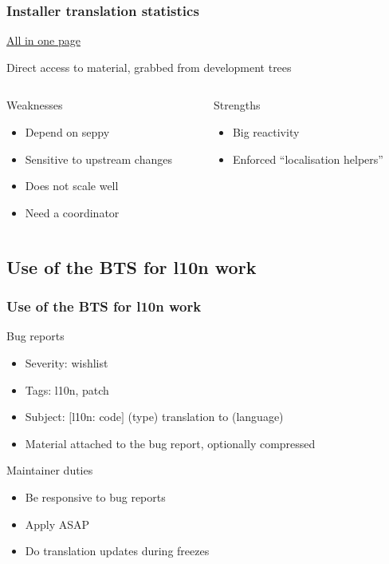 \documentclass{beamer}
\begin{document}
\begin{frame}
  \frametitle{Installer translation statistics}
	\begin{block}
		{\href{http://people.debian.org/~seppy/d-i/translation-status.html}{All in one page}}
	\end{block}
	\begin{block}
		{Direct access to material, grabbed from development trees}
	\end{block}
  \begin{columns}
    \begin{column}{4.5cm}
	\begin{block}
		{Weaknesses}
		\begin{itemize}
		\item
			Depend on seppy
		\item
			Sensitive to upstream changes
		\item
			Does not scale well
		\item
			Need a coordinator
		\end{itemize}
	\end{block}
    \end{column}
    \begin{column}{4.5cm}
	\begin{block}
		{Strengths}
		\begin{itemize}
		\item
			Big reactivity
		\item
			Enforced ``localisation helpers''
		\end{itemize}
	\end{block}
    \end{column}
  \end{columns}
\end{frame}

\subsection{Use of the BTS for l10n work}

\begin{frame}
  \frametitle{Use of the BTS for l10n work}
	\begin{block}
		{Bug reports}
		\begin{itemize}
		\item
			Severity: wishlist
		\item
			Tags: l10n, patch
		\item
			Subject: $[$l10n: code$]$ (type) translation to (language)
		\item
			Material attached to the bug report, optionally compressed
		\end{itemize}
	\end{block}
	\begin{block}
		{Maintainer duties}
		\begin{itemize}
		\item
		{Be responsive to bug reports}
		\item
		{Apply ASAP}
		\item
		{Do translation updates during freezes}
		\end{itemize}
	\end{block}
\end{frame}
\end{document}
